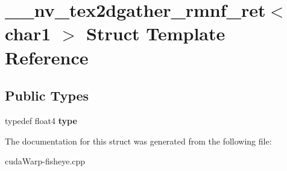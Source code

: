\hypertarget{struct____nv__tex2dgather__rmnf__ret_3_01char1_01_4}{}\section{\+\_\+\+\_\+nv\+\_\+tex2dgather\+\_\+rmnf\+\_\+ret$<$ char1 $>$ Struct Template Reference}
\label{struct____nv__tex2dgather__rmnf__ret_3_01char1_01_4}
\subsection*{Public Types}
\begin{DoxyCompactItemize}
\item 
typedef float4 {\bfseries type}\hypertarget{struct____nv__tex2dgather__rmnf__ret_3_01char1_01_4_a500235b3fbc0d70c5c2d9d2c443d152d}{}\label{struct____nv__tex2dgather__rmnf__ret_3_01char1_01_4_a500235b3fbc0d70c5c2d9d2c443d152d}

\end{DoxyCompactItemize}


The documentation for this struct was generated from the following file\+:\begin{DoxyCompactItemize}
\item 
cuda\+Warp-\/fisheye.\+cpp\end{DoxyCompactItemize}
